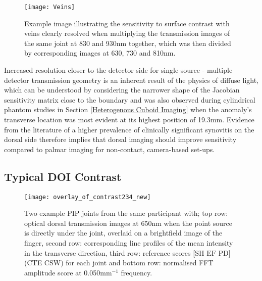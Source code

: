 \documentclass[twoside]{bhamthesis}
\theoremstyle{definition}
\begin{document}
\begin{figure}[!ht]
\centering\texttt{[image: Veins]}
\caption{Example image illustrating the sensitivity to surface contrast with veins clearly resolved when multiplying the transmission images of the same joint at 830 and 930nm together, which was then divided by corresponding images at 630, 730 and 810nm.}
\label{fig:Veins}
\end{figure}

Increased resolution closer to the detector side for single source - multiple detector transmission geometry is an inherent result of the physics of diffuse light, which can be understood by considering the narrower shape of the Jacobian sensitivity matrix close to the boundary and was also observed during cylindrical phantom studies in Section \ref{Heterogenous Cuboid Imaging} when the anomaly's transverse location was most evident at its highest position of 19.3mm. Evidence from the literature of a higher prevalence of clinically significant synovitis on the dorsal side therefore implies that dorsal imaging should improve sensitivity compared to palmar imaging for non-contact, camera-based set-ups. 

\subsection{Typical DOI Contrast}

\begin{figure}[!ht]
\centering
  \texttt{[image: overlay\_of\_contrast234\_new]}
\caption{Two example PIP joints from the same participant with; top row: optical dorsal transmission images at 650nm when the point source is directly under the joint, overlaid on a brightfield image of the finger, second row: corresponding line profiles of the mean intensity in the transverse direction, third row: reference scores  [$\mathrm{SH}$ $\mathrm{EF}$ $\mathrm{PD}$] (CTE CSW) for each joint and bottom row: normalised FFT amplitude score at 0.050mm$^{-1}$ frequency.}
  \label{fig:Typical_contrast}
\end{figure}
\end{document}
